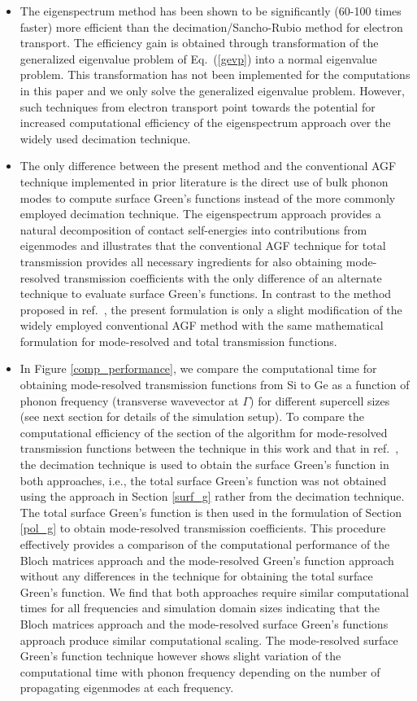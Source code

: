 \documentclass[11pt]{article}
\begin{document}
\begin{itemize}
\item The eigenspectrum method has been shown to be significantly (60-100 times faster) more efficient \cite{luisier2006atomistic} than the decimation/Sancho-Rubio method for electron transport. The efficiency gain is obtained through transformation of the generalized eigenvalue problem of Eq.~(\ref{gevp}) into a normal eigenvalue problem. This transformation has not been implemented for the computations in this paper and we only solve the generalized eigenvalue problem. However, such techniques from electron transport \cite{luisier2006atomistic} point towards the potential for increased computational efficiency of the eigenspectrum approach over the widely used decimation technique.  
\item The only difference between the present method and the conventional AGF technique implemented in prior literature is the direct use of bulk phonon modes to compute surface Green's functions instead of the more commonly employed decimation technique. The eigenspectrum approach provides a natural decomposition of contact self-energies into contributions from eigenmodes and illustrates that the conventional AGF technique for total transmission provides all necessary ingredients for also obtaining mode-resolved transmission coefficients with the only difference of an alternate technique to evaluate surface Green's functions. In contrast to the method proposed in ref.~\cite{ong2015efficient}, the present formulation is only a slight modification of the widely employed conventional AGF method with the same mathematical formulation for mode-resolved and total transmission functions. 
\item In Figure \ref{comp_performance}, we compare the computational time for obtaining mode-resolved transmission functions from Si to Ge as a function of phonon frequency (transverse wavevector at $\Gamma$) for different supercell sizes (see next section for details of the simulation setup). To compare the computational efficiency of the section of the algorithm for mode-resolved transmission functions between the technique in this work and that in ref.~\cite{ong2015efficient}, the decimation technique is used to obtain the surface Green's function in both approaches, i.e., the total surface Green's function was not obtained using the approach in Section \ref{surf_g} rather from the decimation technique. The total surface Green's function is then used in the formulation of Section \ref{pol_g} to obtain mode-resolved transmission coefficients. This procedure effectively provides a comparison of the computational performance of the Bloch matrices approach and the mode-resolved Green's function approach without any differences in the technique for obtaining the total surface Green's function. We find that both approaches require similar computational times for all frequencies and simulation domain sizes indicating that the Bloch matrices approach and the mode-resolved surface Green's functions approach produce similar computational scaling. The mode-resolved surface Green's function technique however shows slight variation of the computational time with phonon frequency depending on the number of propagating eigenmodes at each frequency. 
\end{itemize}
\end{document}

